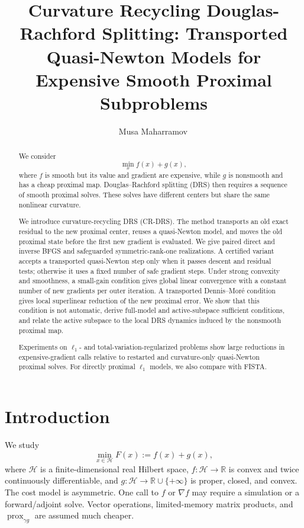 \documentclass[10pt,leqno]{amsart}
\title[Curvature-Recycling Douglas--Rachford Splitting]{Curvature Recycling Douglas-Rachford Splitting: Transported Quasi-Newton Models for Expensive Smooth Proximal Subproblems}
\author[M. Maharramov]{Musa Maharramov\,\orcidlink{0000-0002-4323-0987}}
\date{}
\numberwithin{equation}{section}
\numberwithin{algorithm}{section}
\theoremstyle{remark}
\newcommand{\Hcal}{\mathcal{H}}
\newcommand{\R}{\mathbb{R}}
\DeclareMathOperator{\prox}{prox}
\newcommand{\grad}{\nabla}
\begin{document}
\begin{abstract}
We consider
\[
    \min_x f(x)+g(x),
\]
where $f$ is smooth but its value and gradient are expensive, while $g$ is nonsmooth and has a cheap proximal map.  Douglas--Rachford splitting (DRS) then requires a sequence of smooth proximal solves.  These solves have different centers but share the same nonlinear curvature.

We introduce curvature-recycling DRS (CR-DRS).  The method transports an old exact residual to the new proximal center, reuses a quasi-Newton model, and moves the old proximal state before the first new gradient is evaluated.  We give paired direct and inverse BFGS and safeguarded symmetric-rank-one realizations.  A certified variant accepts a transported quasi-Newton step only when it passes descent and residual tests; otherwise it uses a fixed number of safe gradient steps.  Under strong convexity and smoothness, a small-gain condition gives global linear convergence with a constant number of new gradients per outer iteration.  A transported Dennis--Mor\'e condition gives local superlinear reduction of the new proximal error.  We show that this condition is not automatic, derive full-model and active-subspace sufficient conditions, and relate the active subspace to the local DRS dynamics induced by the nonsmooth proximal map.

Experiments on $\ell_1$- and total-variation-regularized problems show large reductions in expensive-gradient calls relative to restarted and curvature-only quasi-Newton proximal solves.  For directly proximal $\ell_1$ models, we also compare with FISTA.
\end{abstract}

\maketitle

\section{Introduction}
\label{sec:introduction}

We study
\begin{equation}
\label{eq:main-problem}
    \min_{x\in\Hcal} F(x):=f(x)+g(x),
\end{equation}
where $\Hcal$ is a finite-dimensional real Hilbert space, $f:\Hcal\to\R$ is convex and twice continuously differentiable, and $g:\Hcal\to\R\cup\{+\infty\}$ is proper, closed, and convex.  The cost model is asymmetric.  One call to $f$ or $\grad f$ may require a simulation or a forward/adjoint solve.  Vector operations, limited-memory matrix products, and $\prox_{\gamma g}$ are assumed much cheaper.
\end{document}
